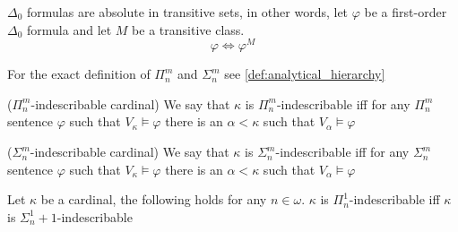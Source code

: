 \begin{lemma}\label{lemma:delta_0_absolute}
$\Delta_0$ formulas are absolute in transitive sets, in other words, let $\varphi$ be a first-order $\Delta_0$ formula and let $M$ be a transitive class.
\begin{equation}
\varphi \iff \varphi^M
\end{equation}
\end{lemma}


For the exact definition of $\Pi^m_n$ and $\Sigma^m_n$ see \ref{def:analytical_hierarchy}

\begin{definition}{($\Pi^m_n$-indescribable cardinal)}\label{def:pi_mn_indescribable}
We say that $\kappa$ is $\Pi^m_n$-indescribable iff for any $\Pi^m_n$ sentence $\varphi$ such that $V_\kappa \models \varphi$ there is an $\alpha < \kappa$ such that $V_\alpha \models \varphi$
\end{definition}
\begin{definition}{($\Sigma^m_n$-indescribable cardinal)}\label{def:sigma_mn_indescribable}
We say that $\kappa$ is $\Sigma^m_n$-indescribable iff for any $\Sigma^m_n$ sentence $\varphi$ such that $V_\kappa \models \varphi$ there is an $\alpha < \kappa$ such that $V_\alpha \models \varphi$
\end{definition}

\begin{lemma}
Let $\kappa$ be a cardinal, the following holds for any $n \in \omega$. $\kappa$ is $\Pi^1_n$-indescribable iff $\kappa$ is $\Sigma^1_n+1$-indescribable
\end{lemma}

